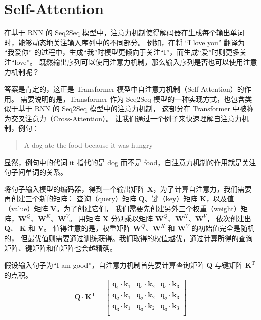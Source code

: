 \section{Self-Attention}
在基于 RNN 的 Seq2Seq 模型中，注意力机制使得解码器在生成每个输出单词时，能够动态地关注输入序列中的不同部分。
例如，在将 “I love you” 翻译为 “我爱你” 的过程中，生成“我”时模型更倾向于关注“I”，而生成“爱”时则更多关注“love”。
既然输出序列可以使用注意力机制，那么输入序列是否也可以使用注意力机制呢？

答案是肯定的，这正是 Transformer 模型中自注意力机制（Self-Attention）的作用。
需要说明的是，Transformer 作为 Seq2Seq 模型的一种实现方式，也包含类似于基于 RNN 的 Seq2Seq 模型中的注意力机制，
这部分在 Transformer 中被称为交叉注意力（Cross-Attention）。
让我们通过一个例子来快速理解自注意力机制，例句：
\begin{quotation}
	A dog ate the food because it was hungry
\end{quotation}
显然，例句中的代词 it 指代的是 dog  而不是 food，自注意力机制的作用就是关注句子间单词的关系。

将句子输入模型的编码器，得到一个输出矩阵 $\mathbf{X}$，为了计算自注意力，我们需要再创建三个新的矩阵：
查询（query）矩阵 $\mathbf{Q}$、键（key）矩阵 $\mathbf{K}$，以及值（value）矩阵 $\mathbf{V}$。为了创建它们，
我们需要先创建另外三个权重（weight）矩阵，$\mathbf{W}^Q$、$\mathbf{W}^K$、$\mathbf{W}^V$。
用矩阵 $\mathbf{X}$ 分别乘以矩阵 $\mathbf{W}^Q$、$\mathbf{W}^K$、$\mathbf{W}^V$，
依次创建出 $\mathbf{Q}$、 $\mathbf{K}$ 和 $\mathbf{V}$。
值得注意的是，权重矩阵 $\mathbf{W}^Q$、$\mathbf{W}^K$ 和 $\mathbf{W}^V$ 的初始值完全是随机的，
但最优值则需要通过训练获得。我们取得的权值越优，通过计算所得的查询矩阵、键矩阵和值矩阵也会越精确。

假设输入句子为“I am good”，自注意力机制首先要计算查询矩阵 $\boldsymbol{Q}$ 与键矩阵 $\boldsymbol{K}^\mathrm{T}$ 的点积。
$$
	\boldsymbol{Q} \cdot \boldsymbol{K}^\mathrm{T} =
	\begin{bmatrix}
		\boldsymbol{q}_1 \cdot \boldsymbol{k}_1 & \boldsymbol{q}_1 \cdot \boldsymbol{k}_2 & \boldsymbol{q}_1 \cdot \boldsymbol{k}_3 \\
		\boldsymbol{q}_2 \cdot \boldsymbol{k}_1 & \boldsymbol{q}_2 \cdot \boldsymbol{k}_2 & \boldsymbol{q}_2 \cdot \boldsymbol{k}_3 \\
		\boldsymbol{q}_3 \cdot \boldsymbol{k}_1 & \boldsymbol{q}_3 \cdot \boldsymbol{k}_2 & \boldsymbol{q}_3 \cdot \boldsymbol{k}_3 \\
	\end{bmatrix}
$$

